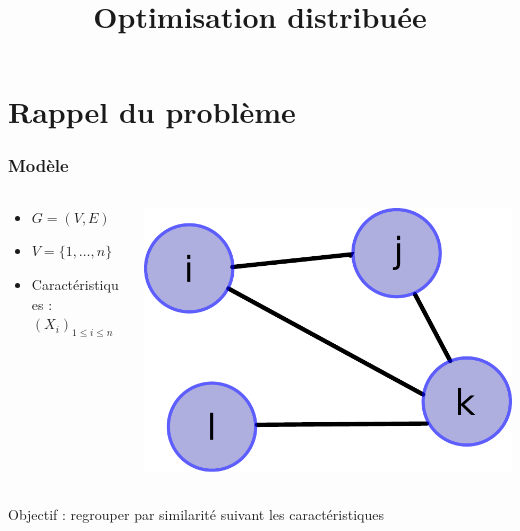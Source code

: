 \documentclass[a4paper, c]{beamer}
\title{Optimisation distribu\'ee}
\begin{document}
\section{Rappel du problème}

\begin{frame}
    \frametitle{Modèle}

    \begin{columns}
        \begin{column}{.5\textwidth}
            \begin{itemize}
                \item $G = (V, E)$
                \item $V = \{1,\ldots,n\}$
                \item Caractéristiques : $(X_i)_{1\leq i \leq n}$
            \end{itemize}
        \end{column}
        \begin{column}{.3\textwidth}
            \begin{center}
                \includegraphics[width=.9\textwidth]{Figures/graph.pdf}
            \end{center}
        \end{column}
    \end{columns}
    \vspace{.5cm}
    Objectif : regrouper par similarité suivant les caractéristiques
\end{frame}
\end{document}
